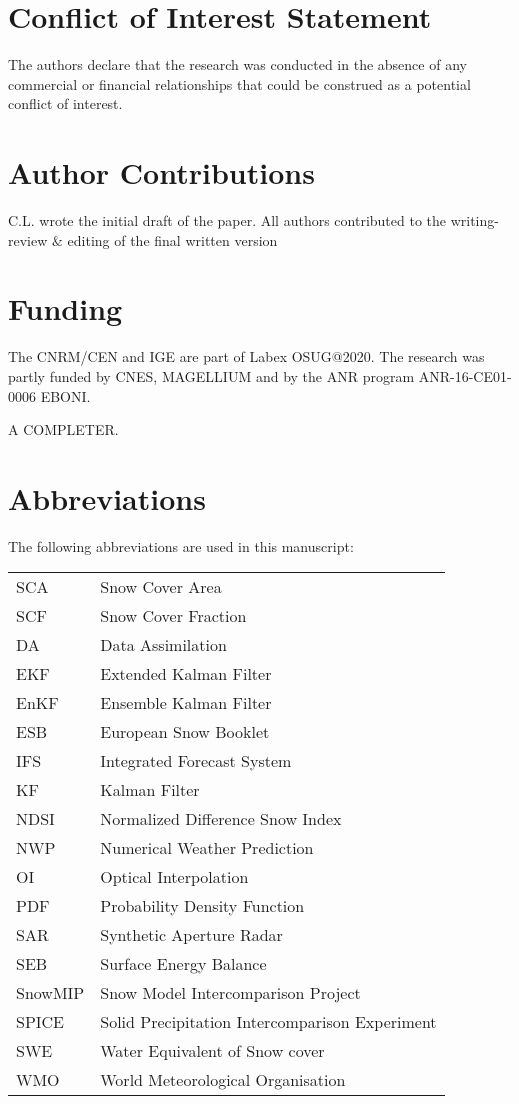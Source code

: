 \documentclass[utf8]{frontiersSCNS} %
\begin{document}
\section*{Conflict of Interest Statement}
The authors declare that the research was conducted in the absence of any commercial or financial relationships that could be construed as a potential conflict of interest.

\section*{Author Contributions}
C.L. wrote the initial draft of the paper. All authors contributed to the writing-review $\&$ editing of the final written version

\section*{Funding}
The CNRM/CEN and IGE are part of Labex OSUG@2020. The research was partly funded by CNES, MAGELLIUM and by the ANR program ANR-16-CE01-0006 EBONI.

A COMPLETER.

\section*{Abbreviations}

The following abbreviations are used in this manuscript:\\
	
\noindent 
\begin{tabular}{@{}ll}
		SCA & Snow Cover Area\\
		SCF & Snow Cover Fraction\\
		DA & Data Assimilation\\
		EKF & Extended Kalman Filter\\
		EnKF & Ensemble Kalman Filter\\
		ESB & European Snow Booklet\\
		IFS & Integrated Forecast System\\
		KF & Kalman Filter\\
		NDSI & Normalized Difference Snow Index\\
		NWP & Numerical Weather Prediction\\
		OI & Optical Interpolation\\
		PDF & Probability Density Function\\
		SAR & Synthetic Aperture Radar\\
		SEB & Surface Energy Balance\\
		SnowMIP & Snow Model Intercomparison Project\\
		SPICE & Solid Precipitation Intercomparison Experiment\\
		SWE & Water Equivalent of Snow cover\\
		WMO & World Meteorological Organisation
\end{tabular}
\end{document}
